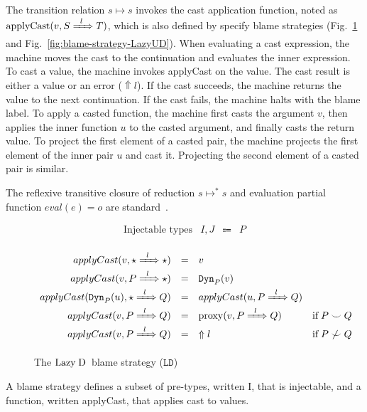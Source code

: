 \documentclass[runningheads]{llncs}
\newcommand{\sidecond}[1]{\text{if}\;#1}
\newcommand{\figequalto}[3]{#1 & = & #2 & #3 \\}
\newcommand{\stxrule}[3]{\text{#2} & #1 & \Coloneqq & #3\\}
\newcommand{\LD}{\ensuremath{\text{Lazy\;D}}}
\newcommand{\just}[1]{\ensuremath{#1}}
\newcommand{\error}[1]{\ensuremath{\Uparrow#1}}
\newcommand{\Tdyn}[0]{\ensuremath{\star}}
\newcommand{\ccast}[3]{#1 \xRightarrow[]{\enskip #2 \enskip} #3}
\newcommand{\vdyn}[2]{\mathtt{Dyn}_{#1}(#2)}
\newcommand{\BLD}[0]{\ensuremath{\mathtt{LD}}}
\newcommand{\proxy}[2]{\ensuremath{\mathrm{proxy}(#1,#2)}}
\newcommand{\applyCast}[2]{\ensuremath{\mathrm{applyCast}(#1,#2)}}
\newcommand{\shallowlyconsistent}[2]{\ensuremath{#1\smile#2}}
\newcommand{\notshallowlyconsistent}[2]{\ensuremath{#1\not\smile#2}}
\newcommand{\transitivelyreduceto}[2]{\ensuremath{#1 \longmapsto^{*} #2}}
\newcommand{\reduceto}[2]{\ensuremath{#1 \longmapsto #2}}
\newcommand{\evalto}[2]{\ensuremath{\mathit{eval}(#1)=#2}}
\begin{document}
The transition relation \reduceto{s}{s} invokes the cast application
function, noted as $\applyCast{v}{\ccast{S}{l}{T}}$, which is also defined
by specify blame strategies (Fig.~\ref{fig:blame-strategy-LazyD} and
Fig.~\ref{fig:blame-strategy-LazyUD}).
%
When evaluating a cast expression, the machine moves the cast to the
continuation and evaluates the inner expression.
%
To cast a value, the machine invokes applyCast on the value. The cast
result is either a value or an error (\error{l}). If the cast
succeeds, the machine returns the value to the next continuation.  If
the cast fails, the machine halts with the blame label.
%
To apply a casted function, the machine first casts the argument $v$, then
applies the inner function $u$ to the casted argument, and finally
casts the return value.
%
To project the first element of a casted pair, the machine projects
the first element of the inner pair $u$ and cast it.
%
Projecting the second element of a casted pair is similar.

The reflexive transitive closure of reduction \transitivelyreduceto{s}{s}
and evaluation partial function ${\evalto{e}{o}}$ are standard~\citep{felleisen03:_pllc}.

\begin{figure}[tp]
\[
\begin{array}{lrcl}
\stxrule{I,J}{Injectable types}{P}
\end{array}
\]
	
\fbox{$\mathit{applyCast}_{\BLD}(v,\ccast{S}{l}{T}) = r$}
\[
\begin{array}{rclr}
\figequalto{
	applyCast(v,\ccast{\Tdyn}{l}{\Tdyn})
}{
	\just{v}
}{}
\figequalto{
applyCast(v,\ccast{P}{l}{\Tdyn})
}{
	\just{\vdyn{P}{v}}
}{}
\figequalto{
	applyCast(\vdyn{P}{u},\ccast{\Tdyn}{l}{Q})
}{
	applyCast(u,\ccast{P}{l}{Q})
}{}
\figequalto{
	applyCast(v,\ccast{P}{l}{Q})
}{
	\just{\proxy{v}{\ccast{P}{l}{Q}}}
}{\sidecond{\shallowlyconsistent{P}{Q}}}
\figequalto{
	applyCast(v,\ccast{P}{l}{Q})
}{
	\error{l}
}{\sidecond{\notshallowlyconsistent{P}{Q}}}
\end{array}
\]
\caption{The \LD\ blame strategy (\BLD)}
\label{fig:blame-strategy-LazyD}
\end{figure}

\begin{definition}
A blame strategy defines a subset of pre-types, written I, that is injectable,
and a function, written applyCast, that applies cast to values.
\end{definition}
\end{document}
